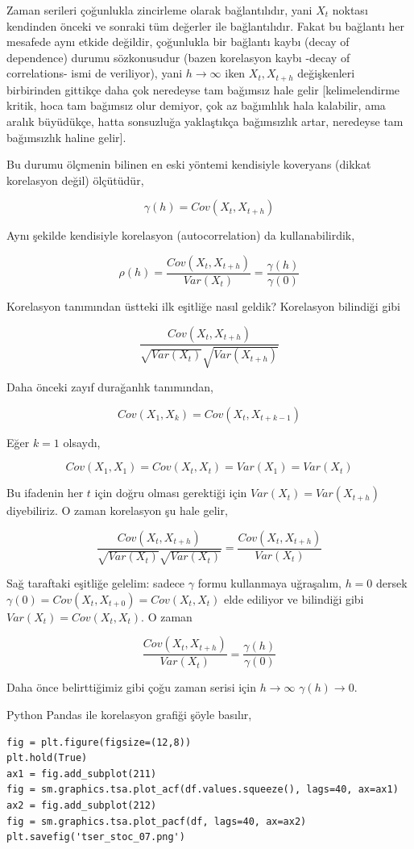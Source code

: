 \documentclass[12pt,fleqn]{article}\usepackage{../../common}
\begin{document}
Zaman serileri çoğunlukla zincirleme olarak bağlantılıdır, yani $X_t$ noktası
kendinden önceki ve sonraki tüm değerler ile bağlantılıdır. Fakat bu bağlantı
her mesafede aynı etkide değildir, çoğunlukla bir bağlantı kaybı (decay of
dependence) durumu sözkonusudur (bazen korelasyon kaybı -decay of correlations-
ismi de veriliyor), yani $h \to \infty$ iken $X_t,X_{t+h}$ değişkenleri
birbirinden gittikçe daha çok neredeyse tam bağımsız hale gelir [kelimelendirme
  kritik, hoca tam bağımsız olur demiyor, çok az bağımlılık hala kalabilir, ama
  aralık büyüdükçe, hatta sonsuzluğa yaklaştıkça bağımsızlık artar, neredeyse
  tam bağımsızlık haline gelir].

Bu durumu ölçmenin bilinen en eski yöntemi kendisiyle koveryans (dikkat
korelasyon değil) ölçütüdür,

$$ \gamma(h) = Cov(X_t,X_{t+h}) $$

Aynı şekilde kendisiyle korelasyon (autocorrelation) da kullanabilirdik, 

$$ 
\rho(h) = \frac{Cov(X_t,X_{t+h}) }{Var(X_t) } = \frac{\gamma(h)}{\gamma(0)}
$$

Korelasyon tanımından üstteki ilk eşitliğe nasıl geldik? Korelasyon bilindiği
gibi

$$ \frac{Cov(X_t,X_{t+h}) }{\sqrt{Var(X_t)}\sqrt{Var(X_{t+h})} } $$

Daha önceki zayıf durağanlık tanımından,

$$ Cov(X_1,X_k) = Cov(X_t,X_{t+k-1}) $$

Eğer $k=1$ olsaydı, 

$$ Cov(X_1,X_1) = Cov(X_t,X_t) = Var(X_1) = Var(X_t)$$

Bu ifadenin her $t$ için doğru olması gerektiği için $Var(X_t) = Var(X_{t+h})$
diyebiliriz. O zaman korelasyon şu hale gelir,

$$
\frac{Cov(X_t,X_{t+h}) }{\sqrt{Var(X_t)}\sqrt{Var(X_t)} }  =
\frac{Cov(X_t,X_{t+h}) }{Var(X_t)} 
$$

Sağ taraftaki eşitliğe gelelim: sadece $\gamma$ formu kullanmaya uğraşalım,
$h=0$ dersek $\gamma(0) = Cov(X_t,X_{t+0}) = Cov(X_t,X_t)$ elde ediliyor ve
bilindiği gibi $Var(X_t)=Cov(X_t,X_t)$. O zaman

$$ \frac{Cov(X_t,X_{t+h}) }{Var(X_t)} = \frac{\gamma(h)}{\gamma(0)} $$

Daha önce belirttiğimiz gibi çoğu zaman serisi için $h \to \infty$
$\gamma(h) \to 0$. 

Python Pandas ile korelasyon grafiği şöyle basılır,

\begin{verbatim}
fig = plt.figure(figsize=(12,8))
plt.hold(True)
ax1 = fig.add_subplot(211)
fig = sm.graphics.tsa.plot_acf(df.values.squeeze(), lags=40, ax=ax1)
ax2 = fig.add_subplot(212)
fig = sm.graphics.tsa.plot_pacf(df, lags=40, ax=ax2)
plt.savefig('tser_stoc_07.png')
\end{verbatim}
\end{document}
